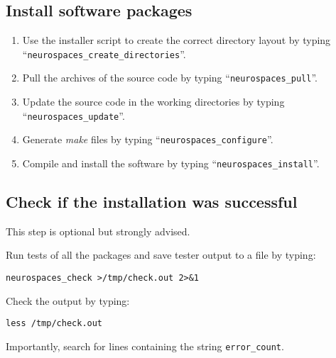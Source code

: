 \documentclass[12pt]{article}
\begin{document}
\subsection*{Install software packages}

\begin{enumerate}
   \item Use the installer script to create the correct directory layout by typing ``{\tt neurospaces\_create\_directories}''.
   \item Pull the archives of the source code by typing ``{\tt neurospaces\_pull}''.
   \item Update the source code in the working directories by typing ``{\tt neurospaces\_update}''.
   \item Generate {\it make} files by typing ``{\tt neurospaces\_configure}''.
   \item Compile and install the software by typing ``{\tt neurospaces\_install}''.
\end{enumerate}

\subsection*{Check if the installation was successful}

This step is optional but strongly advised.

\begin{description}
   \item Run tests of all the packages and save tester output to a file  by typing:
   \begin{verbatim}
neurospaces_check >/tmp/check.out 2>&1
   \end{verbatim}
   \item Check the output by typing:
   \begin{verbatim}
less /tmp/check.out
   \end{verbatim}
   \item Importantly, search for lines containing the string {\tt error\_count}.
\end{description}
    


\end{document}

